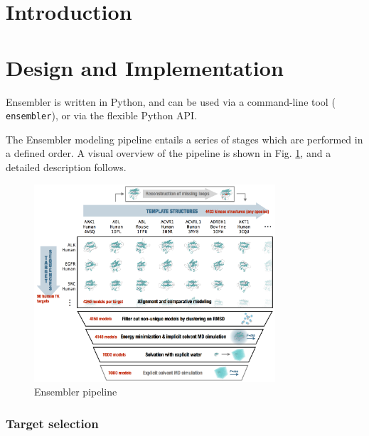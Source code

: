 \documentclass[aps,pre,twocolumn,nofootinbib,superscriptaddress,linenumbers]{revtex4-1}
\begin{document}
\section{Introduction}
\label{section:introduction}

\section{Design and Implementation}


Ensembler is written in Python, and can be used via a command-line tool ({\tt
ensembler}), or via the flexible Python API.


The Ensembler modeling pipeline entails a series of stages which are performed
in a defined order. A visual overview of the pipeline is shown in Fig.
\ref{figpipeline}, and a detailed description follows.

\begin{figure}[h]
  \centering
    \includegraphics[width=0.8\textwidth]{pipeline}
  \caption{Ensembler pipeline}
  \label{figpipeline}
\end{figure}

\subsubsection{Target selection}
\end{document}
